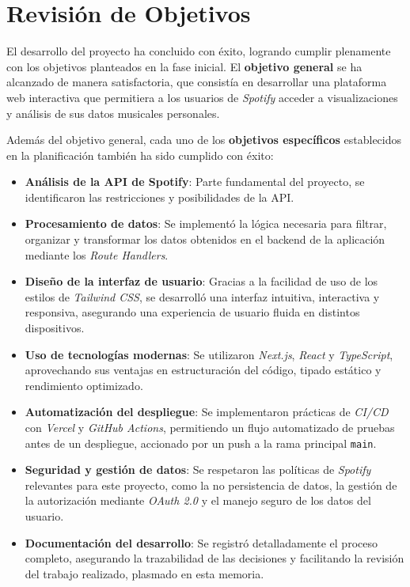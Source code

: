 \section{Revisión de Objetivos}

El desarrollo del proyecto ha concluido con éxito, logrando cumplir plenamente con los objetivos planteados en la fase inicial. El \textbf{objetivo general} se ha alcanzado de manera satisfactoria, que consistía en desarrollar una plataforma web interactiva que permitiera a los usuarios de \textit{Spotify} acceder a visualizaciones y análisis de sus datos musicales personales.

Además del objetivo general, cada uno de los \textbf{objetivos específicos} establecidos en la planificación también ha sido cumplido con éxito:

\begin{itemize}
    \item \textbf{Análisis de la API de Spotify}: Parte fundamental del proyecto, se identificaron las restricciones y posibilidades de la API.
    \item \textbf{Procesamiento de datos}: Se implementó la lógica necesaria para filtrar, organizar y transformar los datos obtenidos en el backend de la aplicación mediante los \textit{Route Handlers}.
    \item \textbf{Diseño de la interfaz de usuario}: Gracias a la facilidad de uso de los estilos de \textit{Tailwind CSS}, se desarrolló una interfaz intuitiva, interactiva y responsiva, asegurando una experiencia de usuario fluida en distintos dispositivos.
    \item \textbf{Uso de tecnologías modernas}: Se utilizaron \textit{Next.js}, \textit{React} y \textit{TypeScript}, aprovechando sus ventajas en estructuración del código, tipado estático y rendimiento optimizado.
    \item \textbf{Automatización del despliegue}: Se implementaron prácticas de \textit{CI/CD} con \textit{Vercel} y \textit{GitHub Actions}, permitiendo un flujo automatizado de pruebas antes de un despliegue, accionado por un push a la rama principal \texttt{main}.
    \item \textbf{Seguridad y gestión de datos}: Se respetaron las políticas de \textit{Spotify} relevantes para este proyecto, como la no persistencia de datos, la gestión de la autorización mediante \textit{OAuth 2.0} y el manejo seguro de los datos del usuario.
    \item \textbf{Documentación del desarrollo}: Se registró detalladamente el proceso completo, asegurando la trazabilidad de las decisiones y facilitando la revisión del trabajo realizado, plasmado en esta memoria.
\end{itemize}

